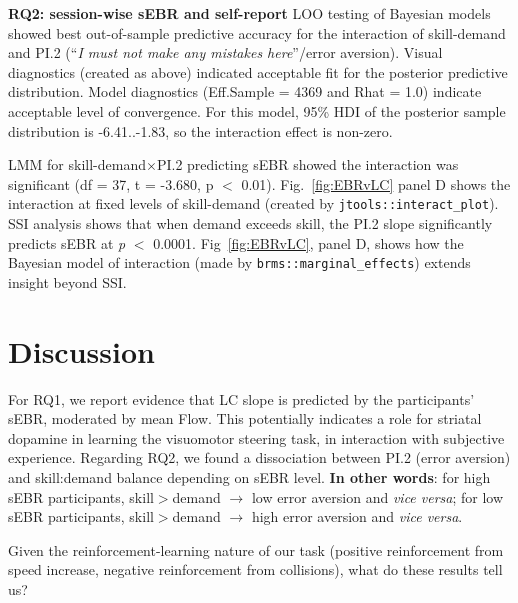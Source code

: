\documentclass[10pt,letterpaper,floatsintext]{article}
\begin{document}
\noindent\textbf{RQ2: session-wise sEBR and self-report}\quad
LOO testing of Bayesian models showed best out-of-sample predictive accuracy for the interaction of skill-demand and PI.2 (``\textit{I must not make any mistakes here}''/error aversion). Visual diagnostics (created as above) indicated acceptable fit for the posterior predictive distribution. Model diagnostics (Eff.Sample = 4369 and Rhat = 1.0) indicate acceptable level of convergence. For this model, 95\% HDI of the posterior sample distribution is -6.41..-1.83, so the interaction effect is non-zero. 

LMM for skill-demand$\times$PI.2 predicting sEBR showed the interaction was significant (df = 37, t = -3.680, p $<$ 0.01). %
Fig.~\ref{fig:EBRvLC} panel D shows the interaction at fixed levels of skill-demand (created by \verb|jtools::interact_plot|). SSI analysis shows that when demand exceeds skill, the PI.2 slope significantly predicts sEBR at {\it p} $<$ 0.0001. %
Fig~\ref{fig:EBRvLC}, panel D, shows how the Bayesian model of interaction (made by \verb|brms::marginal_effects|) extends insight beyond SSI.

\section{Discussion}
For RQ1, we report evidence that LC slope is predicted by the participants' sEBR, moderated by mean Flow. This potentially indicates a role for striatal dopamine in learning the visuomotor steering task, in interaction with subjective experience. 
Regarding RQ2, we found a dissociation between PI.2 (error aversion) and skill:demand balance depending on sEBR level. \textbf{In other words}: for high sEBR participants, skill$>$demand $\rightarrow$ low error aversion and \textit{vice versa}; for low sEBR participants, skill$>$demand $\rightarrow$ high error aversion and \textit{vice versa}.

Given the reinforcement-learning nature of our task (positive reinforcement from speed increase, negative reinforcement from collisions), what do these results tell us?

\end{document}
